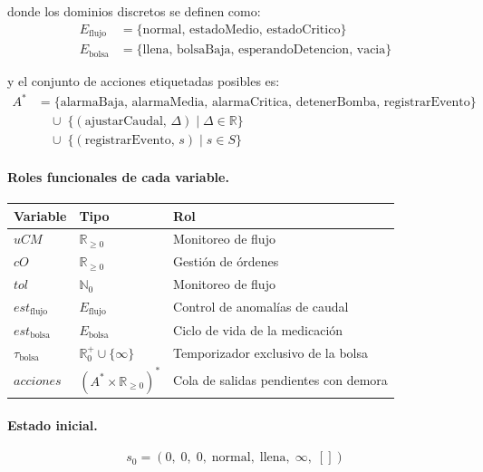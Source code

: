 donde los dominios discretos se definen como:
\begin{align*}
  E_{\mathrm{flujo}} &= \{\mathrm{normal},\,\mathrm{estadoMedio},\,\mathrm{estadoCritico}\} \\
  E_{\mathrm{bolsa}} &= \{\mathrm{llena},\,\mathrm{bolsaBaja},\,\mathrm{esperandoDetencion},\,\mathrm{vacia}\}
\end{align*}

y el conjunto de acciones etiquetadas posibles es:
\begin{align*}
  A^* &= \{\mathrm{alarmaBaja},\,\mathrm{alarmaMedia},\,\mathrm{alarmaCritica},\,
        \mathrm{detenerBomba},\,\mathrm{registrarEvento}\} \\
      &\quad \cup\; \{(\mathrm{ajustarCaudal},\, \Delta) \mid \Delta \in \mathbb{R}\} \\
      &\quad \cup\; \{(\mathrm{registrarEvento},\, s) \mid s \in S\}
\end{align*}

\paragraph{Roles funcionales de cada variable.}

\begin{table}[H]
\centering
\begin{tabular}{lll}
\toprule
Variable & Tipo & Rol \\
\midrule
$uCM$                   & $\mathbb{R}_{\ge 0}$               & Monitoreo de flujo \\
$cO$                    & $\mathbb{R}_{\ge 0}$               & Gestión de órdenes \\
$tol$                   & $\mathbb{N}_0$                     & Monitoreo de flujo \\
$est_{\mathrm{flujo}}$  & $E_{\mathrm{flujo}}$               & Control de anomalías de caudal \\
$est_{\mathrm{bolsa}}$  & $E_{\mathrm{bolsa}}$               & Ciclo de vida de la medicación \\
$\tau_{\mathrm{bolsa}}$ & $\mathbb{R}_0^+\cup\{\infty\}$     & Temporizador exclusivo de la bolsa \\
$\mathit{acciones}$     & $(A^* \times \mathbb{R}_{\ge 0})^*$ & Cola de salidas pendientes con demora \\
\bottomrule
\end{tabular}
\end{table}

\paragraph{Estado inicial.}
\[
  s_0 = (0,\;0,\;0,\;\mathrm{normal},\;\mathrm{llena},\;\infty,\;[])
\]

